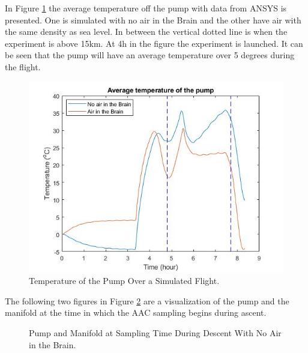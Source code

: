 \documentclass[a4paper,12pt,twoside]{article}
\begin{document}
In Figure \ref{fig:test-flight-AAC-4-6} the average temperature off the pump with data from ANSYS is presented. One is simulated with no air in the Brain and the other have air with the same density as sea level. In between the vertical dotted line is when the experiment is above 15km. At 4h in the figure the experiment is launched. It can be seen that the pump will have an average temperature over 5 degrees during the flight.
\begin{figure}[H]
    \centering
    \includegraphics[width=\textwidth]{4-experiment-design/img/Thermal/pump-temperature-air-no-air.jpg}
    \caption{Temperature of the Pump Over a Simulated Flight.}
    \label{fig:test-flight-AAC-4-6}
\end{figure}

The following two figures in Figure \ref{fig:Pump-Valve-ascent-sample-4-6} are a visualization of the pump and the manifold at the time in which the AAC sampling begins during ascent. 
\begin{figure}[H]
    \centering
    \hifll
    \caption{Pump and Manifold at Sampling Time During Descent With No Air in the Brain.}
    \label{fig:Pump-Valve-ascent-sample-4-6}
\end{figure}
\end{document}
